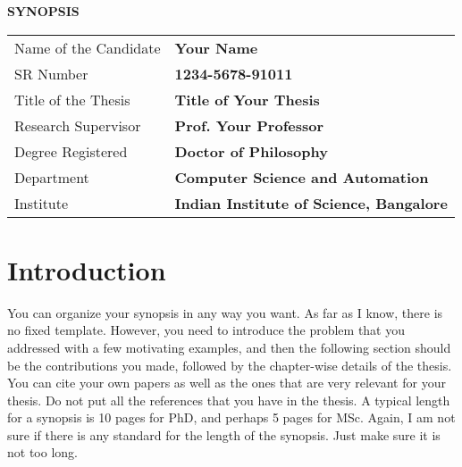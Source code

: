 \documentclass[11pt,psfig]{article}
\begin{document}

\centerline{\Large \bf \sc SYNOPSIS}

\begin{center}
\begin{tabular}[t]{ll}
\medskip
Name of the Candidate &  {\bf Your Name} \\ \medskip
SR Number &  {\bf 1234-5678-91011} \\ \medskip
Title of the Thesis & {\bf  Title of Your Thesis} \\ \medskip
Research Supervisor &  {\bf Prof. Your Professor}\\ \medskip
Degree Registered  & {\bf Doctor of Philosophy}\\ \medskip
Department & {\bf Computer Science and Automation}\\ \medskip
Institute & {\bf Indian Institute of Science, Bangalore}
\end{tabular}
\end{center}

\section{Introduction}
You can organize your synopsis in any way you want. As far as I know, there is no fixed template. However, you need to introduce the problem that you addressed with a few motivating examples, and then the following section should be the contributions you made, followed by the chapter-wise details of the thesis. You can cite your own papers as well as the ones that are very relevant for your thesis. Do not put all the references that you have in the thesis. A typical length for a synopsis is 10 pages for PhD, and perhaps 5 pages for MSc. Again, I am not sure if there is any standard for the length of the synopsis. Just make sure it is not too long.
\end{document}
